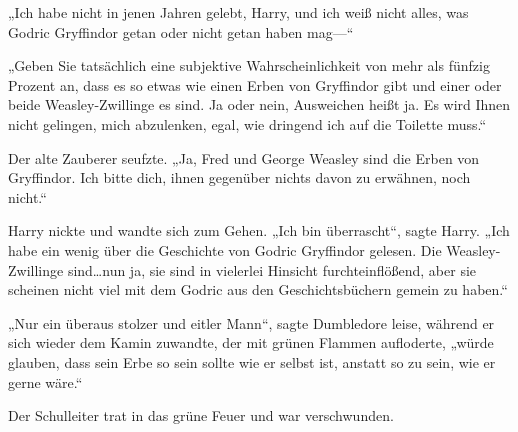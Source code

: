 „Ich habe nicht in jenen Jahren gelebt, Harry, und ich weiß nicht alles, was Godric Gryffindor getan oder nicht getan haben mag—“

„Geben Sie tatsächlich eine subjektive Wahrscheinlichkeit von mehr als fünfzig Prozent an, dass es so etwas wie einen Erben von Gryffindor gibt und einer oder beide Weasley-Zwillinge es sind. Ja oder nein, Ausweichen heißt ja. Es wird Ihnen nicht gelingen, mich abzulenken, egal, wie dringend ich auf die Toilette muss.“

Der alte Zauberer seufzte.
„Ja, Fred und George Weasley sind die Erben von Gryffindor. Ich bitte dich, ihnen gegenüber nichts davon zu erwähnen, noch nicht.“

Harry nickte und wandte sich zum Gehen.
„Ich bin überrascht“, sagte Harry. „Ich habe ein wenig über die Geschichte von Godric Gryffindor gelesen. Die Weasley-Zwillinge sind…nun ja, sie sind in vielerlei Hinsicht furchteinflößend, aber sie scheinen nicht viel mit dem Godric aus den Geschichtsbüchern gemein zu haben.“

„Nur ein überaus stolzer und eitler Mann“, sagte Dumbledore leise, während er sich wieder dem Kamin zuwandte, der mit grünen Flammen aufloderte, „würde glauben, dass sein Erbe so sein sollte wie er selbst ist, anstatt so zu sein, wie er gerne wäre.“

Der Schulleiter trat in das grüne Feuer und war verschwunden.


